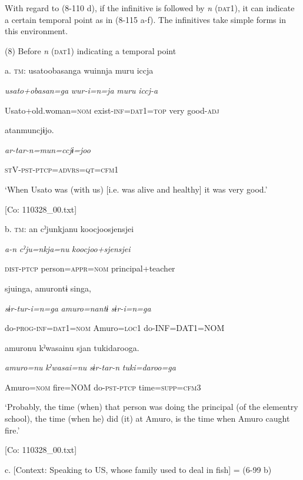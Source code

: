   With regard to (8-110 d), if the infinitive is followed by \textit{n} (\textsc{dat}1), it can indicate a certain temporal point as in (8-115 a-f). The infinitives take simple forms in this environment.

(8)  Before \textit{n} (\textsc{dat}1) indicating a temporal point

  a.  \textsc{tm}:  usatoobasanga  wuinnja  muru  iccja

      \textit{usato+obasan=ga}  \textit{wur-i=n=ja}  \textit{muru}  \textit{iccj-a}

      Usato+old.woman=\textsc{nom}  exist-\textsc{inf}=\textsc{dat}1=\textsc{top}  very  good-\textsc{adj}

      atanmuncjɨjo.

      \textit{ar-tar-n=mun=ccjɨ=joo}

      \textsc{st}V-\textsc{pst}-\textsc{ptcp}=\textsc{advrs}=\textsc{qt}=\textsc{cfm}1

      ‘When Usato was (with us) [i.e. was alive and healthy] it was very good.’

      [Co: 110328\_00.txt]

  b.  \textsc{tm}:  an  cˀjunkjanu  {\textbar}koocjoosjensjei{\textbar}

      \textit{a-n}  \textit{cˀju=nkja=nu}  \textit{koocjoo+sjensjei}

      \textsc{dist}-\textsc{ptcp}  person=\textsc{appr}=\textsc{nom}  principal+teacher

      sjuinga,  amurontɨ  singa,

      \textit{sɨr-tur-i=n=ga}  \textit{amuro=nantɨ}  \textit{sɨr-i=n=ga}

      do-\textsc{prog}-\textsc{inf}=\textsc{dat}1=\textsc{nom}  Amuro=\textsc{loc}1  do-INF=DAT1=NOM

      amuronu  kˀwasainu  sjan  tukidarooga.

      \textit{amuro=nu}  \textit{kˀwasai=nu}  \textit{sɨr-tar-n}  \textit{tuki=daroo=ga}

      Amuro=\textsc{nom}  fire=NOM  do-\textsc{pst}-\textsc{ptcp}  time=\textsc{supp}=\textsc{cfm}3

      ‘Probably, the time (when) that person was doing the principal (of the elementry school), the time (when he) did (it) at Amuro, is the time when Amuro caught fire.’

      [Co: 110328\_00.txt]

  c.  [Context: Speaking to US, whose family used to deal in fish] = (6-99 b)


